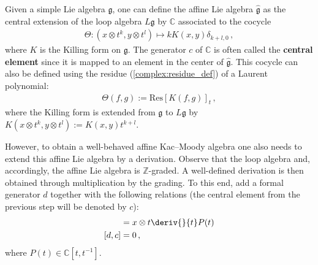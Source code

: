     \begin{definition}
        Given a simple Lie algebra $\mathfrak{g}$, one can define the affine Lie algebra $\widehat{\mathfrak{g}}$ as the central extension of the loop algebra $L\mathfrak{g}$ by $\mathbb{C}$ associated to the cocycle
        \begin{gather}
            \Theta:(x\otimes t^k,y\otimes t^l)\mapsto kK(x,y)\delta_{k+l,0}\,,
        \end{gather}
        where $K$ is the Killing form on $\mathfrak{g}$. The generator $c$ of $\mathbb{C}$ is often called the \textbf{central element} since it is mapped to an element in the center of $\widehat{\mathfrak{g}}$. This cocycle can also be defined using the residue (\cref{complex:residue_def}) of a Laurent polynomial:
        \begin{gather}
            \Theta(f,g) := \mathrm{Res}\left[K(f,g)\right]_t\,,
        \end{gather}
        where the Killing form is extended from $\mathfrak{g}$ to $L\mathfrak{g}$ by $K(x\otimes t^k,y\otimes t^l):=K(x,y)t^{k+l}$.

        However, to obtain a well-behaved affine Kac--Moody algebra one also needs to extend this affine Lie algebra by a derivation. Observe that the loop algebra and, accordingly, the affine Lie algebra is $\mathbb{Z}$-graded. A well-defined derivation is then obtained through multiplication by the grading. To this end, add a formal generator $d$ together with the following relations (the central element from the previous step will be denoted by $c$):
        \begin{align}
            [d,x\otimes P(t)] &= x\otimes t\deriv{}{t}P(t)\\
            [d,c] &= 0\,,
        \end{align}
        where $P(t)\in\mathbb{C}[t,t^{-1}]$.
    \end{definition}

